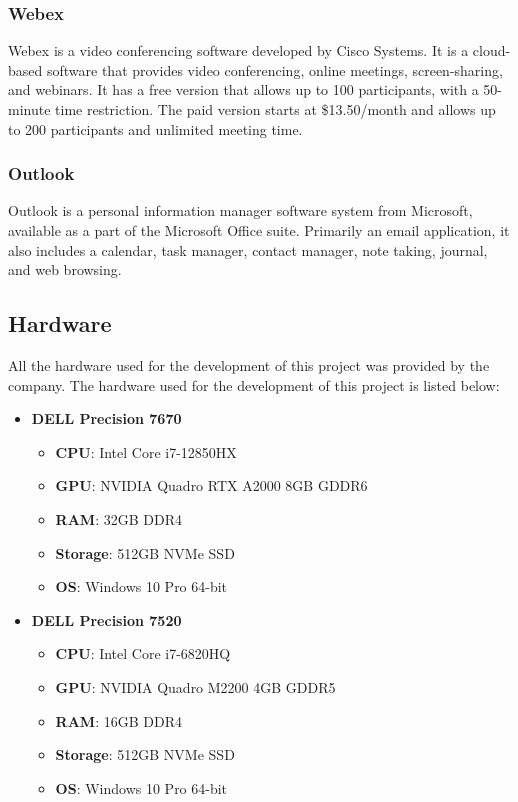 \subsubsection*{Webex}\label{subsubsec:webex}
Webex is a video conferencing software developed by Cisco Systems. It is a
cloud-based software that provides video conferencing, online meetings,
screen-sharing, and webinars. It has a free version that allows up to 100
participants, with a 50-minute time restriction. The paid version starts at
\$13.50/month and allows up to 200 participants and unlimited meeting time.
\subsubsection*{Outlook}\label{subsubsec:outlook}
Outlook is a personal information manager software system from Microsoft,
available as a part of the Microsoft Office suite. Primarily an email
application, it also includes a calendar, task manager, contact manager,
note taking, journal, and web browsing.

\subsection*{Hardware}\label{subsec:hardware}
All the hardware used for the development of this project was provided by the
company. The hardware used for the development of this project is listed below: \\
\begin{itemize}
    \item \textbf{DELL Precision 7670}
    \begin{itemize}
        \item \textbf{CPU}: Intel Core i7-12850HX
        \item \textbf{GPU}: NVIDIA Quadro RTX A2000 8GB GDDR6
        \item \textbf{RAM}: 32GB DDR4
        \item \textbf{Storage}: 512GB NVMe SSD
        \item \textbf{OS}: Windows 10 Pro 64-bit
    \end{itemize}
    \item \textbf{DELL Precision 7520}
    \begin{itemize}
        \item \textbf{CPU}: Intel Core i7-6820HQ
        \item \textbf{GPU}: NVIDIA Quadro M2200 4GB GDDR5
        \item \textbf{RAM}: 16GB DDR4
        \item \textbf{Storage}: 512GB NVMe SSD
        \item \textbf{OS}: Windows 10 Pro 64-bit
    \end{itemize}
\end{itemize}
